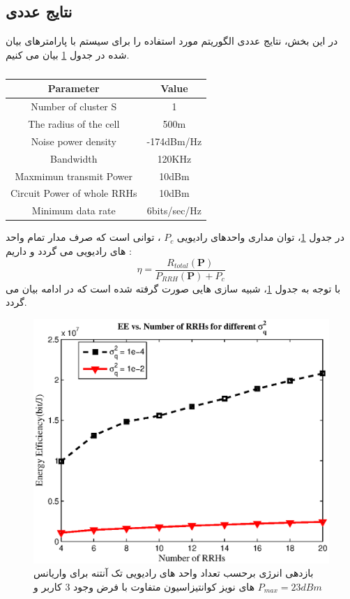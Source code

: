   \subsection{نتایج عددی}
  در این بخش، نتایج عددی الگوریتم مورد استفاده را برای سیستم  با پارامترهای بیان شده در جدول \ref{tab:title1} \cite{mmimoiter} بیان می کنیم.
\begin{latin} 
 \begin{table}[H]
 \caption {} \label{tab:title1} 
 \begin{center}
  \begin{tabular}{||c c ||} 
  \hline
  Parameter & Value \\ [0.5ex] 
  \hline\hline
  Number of cluster S & 1 \\ 
  \hline
    The radius of the cell & 500m \\ 
  \hline
  Noise power density & -174dBm/Hz\\
  \hline
  Bandwidth & 120KHz \\
  \hline
 Maxmimun transmit Power & 10dBm \\
  \hline
Circuit Power of whole RRHs & 10dBm \\
  \hline
  Minimum data rate &  6bits/sec/Hz \\ [1ex] 
  \hline
 \end{tabular}
 \end{center}
 \end{table}
 \end{latin}
در جدول \ref{tab:title1}، توان مداری واحدهای رادیویی $P_c$ ، توانی است که صرف  مدار تمام واحد های رادیویی می گردد \cite{uldl} و داریم :
\begin{equation}
\eta = \frac{R_{total}(\boldsymbol{P})} { P_{RRH}(\boldsymbol{P}) +P_c}
\end{equation} 
با توجه به جدول \ref{tab:title1}، شبیه سازی هایی صورت گرفته شده است که در ادامه بیان می گردد.
\begin{figure}[H]
  \centering
    \includegraphics[width=\linewidth]{./fig/varq}
  \caption{ بازدهی انرژی برحسب تعداد واحد های رادیویی تک آنتنه برای واریانس های نویز کوانتیزاسیون متفاوت با فرض وجود 3 کاربر و $P_{max} = 23dBm$}
  \label{fig:varq}
  \end{figure}
